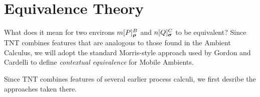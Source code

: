 \documentclass[orivec]{llncs}
\begin{document}
\section{Equivalence Theory}
\label{sec:equivalence-theory}

What does it mean for two environs $\locv{m}{P}{B}{\vec\rho}$ and $\locv{n}{Q}{C}{\vec\sigma}$ to be equivalent? Since TNT combines features that are analogous to those found in the Ambient Calculus, we will adopt the standard Morris-style approach used by Gordon and Cardelli \cite{GC} to define \emph{contextual equivalence} for Mobile Ambients.


Since TNT combines features of several earlier process calculi, we first desribe the approaches taken there.
\end{document}
